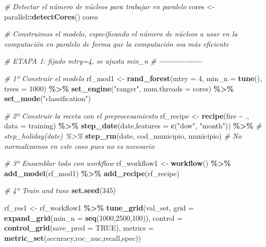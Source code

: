\documentclass[12pt,a4paper,]{book}
\newenvironment{Shaded}{\begin{snugshade}}{\end{snugshade}}
\newcommand{\AttributeTok}[1]{\textcolor[rgb]{0.13,0.29,0.53}{#1}}
\newcommand{\CommentTok}[1]{\textcolor[rgb]{0.56,0.35,0.01}{\textit{#1}}}
\newcommand{\ConstantTok}[1]{\textcolor[rgb]{0.56,0.35,0.01}{#1}}
\newcommand{\DecValTok}[1]{\textcolor[rgb]{0.00,0.00,0.81}{#1}}
\newcommand{\FunctionTok}[1]{\textcolor[rgb]{0.13,0.29,0.53}{\textbf{#1}}}
\newcommand{\NormalTok}[1]{#1}
\newcommand{\OtherTok}[1]{\textcolor[rgb]{0.56,0.35,0.01}{#1}}
\newcommand{\SpecialCharTok}[1]{\textcolor[rgb]{0.81,0.36,0.00}{\textbf{#1}}}
\newcommand{\StringTok}[1]{\textcolor[rgb]{0.31,0.60,0.02}{#1}}
\numberwithin{dummy}{section}
\theoremstyle{ocrenumbox}
\theoremstyle{blacknumex}
\theoremstyle{blacknumbox}
\theoremstyle{ocrenum}
\theoremstyle{ocrenum}
\begin{document}
\begin{Shaded}
\begin{Highlighting}[]
\CommentTok{\# Detectar el número de núcleos para trabajar en paralelo}
\NormalTok{cores }\OtherTok{\textless{}{-}}\NormalTok{ parallel}\SpecialCharTok{::}\FunctionTok{detectCores}\NormalTok{()}
\NormalTok{cores}

\CommentTok{\# Construimos el modelo, especificando el número de núcleos a usar en la computación en paralelo de forma que la computación sea más eficiente}

\CommentTok{\# ETAPA 1: fijado mtry=4, se ajusta min\_n}
\CommentTok{\# {-}{-}{-}{-}{-}{-}{-}{-}{-}{-}{-}{-}{-}{-}{-}{-}{-}}

\CommentTok{\# 1º Construir el modelo}
\NormalTok{rf\_mod1 }\OtherTok{\textless{}{-}} 
  \FunctionTok{rand\_forest}\NormalTok{(}\AttributeTok{mtry =} \DecValTok{4}\NormalTok{, }\AttributeTok{min\_n =} \FunctionTok{tune}\NormalTok{(), }\AttributeTok{trees =} \DecValTok{1000}\NormalTok{) }\SpecialCharTok{\%\textgreater{}\%} 
  \FunctionTok{set\_engine}\NormalTok{(}\StringTok{"ranger"}\NormalTok{, }\AttributeTok{num.threads =}\NormalTok{ cores) }\SpecialCharTok{\%\textgreater{}\%} 
  \FunctionTok{set\_mode}\NormalTok{(}\StringTok{"classification"}\NormalTok{)}

\CommentTok{\# 2º Construir la receta con el preprocesamiento}
\NormalTok{rf\_recipe }\OtherTok{\textless{}{-}} 
  \FunctionTok{recipe}\NormalTok{(fire }\SpecialCharTok{\textasciitilde{}}\NormalTok{ ., }\AttributeTok{data =}\NormalTok{ training) }\SpecialCharTok{\%\textgreater{}\%} 
  \FunctionTok{step\_date}\NormalTok{(date,}\AttributeTok{features =} \FunctionTok{c}\NormalTok{(}\StringTok{"dow"}\NormalTok{, }\StringTok{"month"}\NormalTok{)) }\SpecialCharTok{\%\textgreater{}\%} 
  \CommentTok{\# step\_holiday(date) \%\textgreater{}\% }
  \FunctionTok{step\_rm}\NormalTok{(date, cod\_municipio, municipio) }
\CommentTok{\# No normalizamos en este caso pues no es necesario}

\CommentTok{\# 3º Ensamblar todo con workflow}
\NormalTok{rf\_workflow1 }\OtherTok{\textless{}{-}} 
  \FunctionTok{workflow}\NormalTok{() }\SpecialCharTok{\%\textgreater{}\%} 
  \FunctionTok{add\_model}\NormalTok{(rf\_mod1) }\SpecialCharTok{\%\textgreater{}\%} 
  \FunctionTok{add\_recipe}\NormalTok{(rf\_recipe)}

\CommentTok{\# 4º Train and tune}
\FunctionTok{set.seed}\NormalTok{(}\DecValTok{345}\NormalTok{)}

\NormalTok{rf\_res1 }\OtherTok{\textless{}{-}}
\NormalTok{  rf\_workflow1 }\SpecialCharTok{\%\textgreater{}\%}
  \FunctionTok{tune\_grid}\NormalTok{(val\_set,}
            \AttributeTok{grid =} \FunctionTok{expand\_grid}\NormalTok{(}\AttributeTok{min\_n =} \FunctionTok{seq}\NormalTok{(}\DecValTok{1000}\NormalTok{,}\DecValTok{2500}\NormalTok{,}\DecValTok{100}\NormalTok{)),}
            \AttributeTok{control =} \FunctionTok{control\_grid}\NormalTok{(}\AttributeTok{save\_pred =} \ConstantTok{TRUE}\NormalTok{),}
            \AttributeTok{metrics =} \FunctionTok{metric\_set}\NormalTok{(accuracy,roc\_auc,recall,spec))}


\end{Highlighting}
\end{Shaded}
\end{document}
